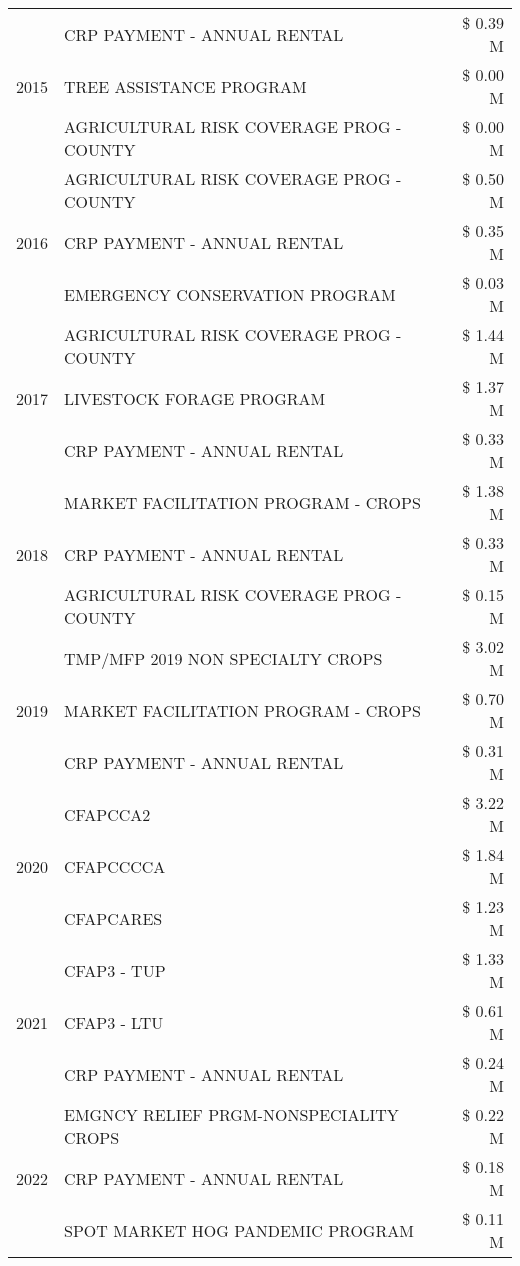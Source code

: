 \begin{tabular}{llr}
\multirow[t]{3}{*}{2015} & CRP PAYMENT - ANNUAL RENTAL & \$ 0.39 M \\
 & TREE ASSISTANCE PROGRAM & \$ 0.00 M \\
 & AGRICULTURAL RISK COVERAGE PROG - COUNTY & \$ 0.00 M \\
\cline{1-3}
\multirow[t]{3}{*}{2016} & AGRICULTURAL RISK COVERAGE PROG - COUNTY & \$ 0.50 M \\
 & CRP PAYMENT - ANNUAL RENTAL & \$ 0.35 M \\
 & EMERGENCY CONSERVATION PROGRAM & \$ 0.03 M \\
\cline{1-3}
\multirow[t]{3}{*}{2017} & AGRICULTURAL RISK COVERAGE PROG - COUNTY & \$ 1.44 M \\
 & LIVESTOCK FORAGE PROGRAM & \$ 1.37 M \\
 & CRP PAYMENT - ANNUAL RENTAL & \$ 0.33 M \\
\cline{1-3}
\multirow[t]{3}{*}{2018} & MARKET FACILITATION PROGRAM - CROPS & \$ 1.38 M \\
 & CRP PAYMENT - ANNUAL RENTAL & \$ 0.33 M \\
 & AGRICULTURAL RISK COVERAGE PROG - COUNTY & \$ 0.15 M \\
\cline{1-3}
\multirow[t]{3}{*}{2019} & TMP/MFP 2019 NON SPECIALTY CROPS & \$ 3.02 M \\
 & MARKET FACILITATION PROGRAM - CROPS & \$ 0.70 M \\
 & CRP PAYMENT - ANNUAL RENTAL & \$ 0.31 M \\
\cline{1-3}
\multirow[t]{3}{*}{2020} & CFAPCCA2 & \$ 3.22 M \\
 & CFAPCCCCA & \$ 1.84 M \\
 & CFAPCARES & \$ 1.23 M \\
\cline{1-3}
\multirow[t]{3}{*}{2021} & CFAP3 - TUP & \$ 1.33 M \\
 & CFAP3 - LTU & \$ 0.61 M \\
 & CRP PAYMENT - ANNUAL RENTAL & \$ 0.24 M \\
\cline{1-3}
\multirow[t]{3}{*}{2022} & EMGNCY RELIEF PRGM-NONSPECIALITY CROPS & \$ 0.22 M \\
 & CRP PAYMENT - ANNUAL RENTAL & \$ 0.18 M \\
 & SPOT MARKET HOG PANDEMIC PROGRAM & \$ 0.11 M \\
\cline{1-3}
\bottomrule
\end{tabular}
